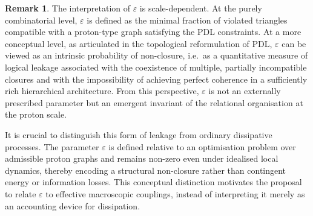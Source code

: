 \documentclass[11pt,a4paper]{article}
\theoremstyle{definition}
\newtheorem{remark}[theorem]{Remark}
\begin{document}
\begin{remark}
The interpretation of $\varepsilon$ is scale-dependent. At the purely combinatorial level, $\varepsilon$ is defined as the minimal fraction of violated triangles compatible with a proton-type graph satisfying the PDL constraints.\cite{Combinatorial_Proton_v2_2026} At a more conceptual level, as articulated in the topological reformulation of PDL, $\varepsilon$ can be viewed as an intrinsic probability of non-closure, i.e.\ as a quantitative measure of logical leakage associated with the coexistence of multiple, partially incompatible closures and with the impossibility of achieving perfect coherence in a sufficiently rich hierarchical architecture.\cite{Topological_Reformulation_PDL_2026} From this perspective, $\varepsilon$ is not an externally prescribed parameter but an emergent invariant of the relational organisation at the proton scale.

It is crucial to distinguish this form of leakage from ordinary dissipative processes. The parameter $\varepsilon$ is defined relative to an optimisation problem over admissible proton graphs and remains non-zero even under idealised local dynamics, thereby encoding a structural non-closure rather than contingent energy or information losses.\cite{Exponent_18_PDL_2026,PDL_Global_Mapping_2026} This conceptual distinction motivates the proposal to relate $\varepsilon$ to effective macroscopic couplings, instead of interpreting it merely as an accounting device for dissipation.
\end{remark}
\end{document}
